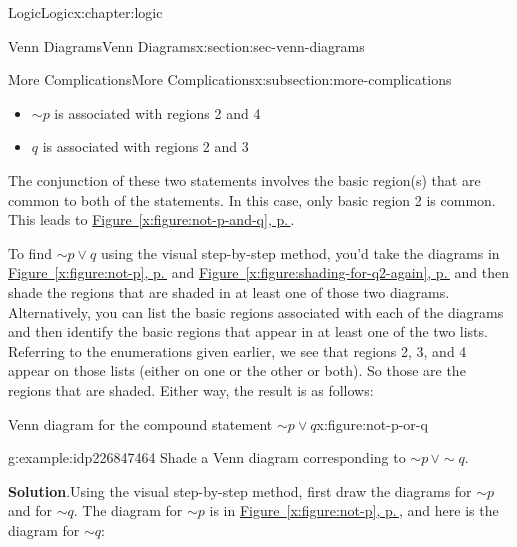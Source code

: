 \documentclass[twoside,10pt,]{book}
\newcommand{\blocktitlefont}{\relax}
\newcommand{\xreffont}{\relax}
\numberwithin{equation}{section}
\begin{document}
\begin{chapterptx}{Logic}{}{Logic}{}{}{x:chapter:logic}
\begin{sectionptx}{Venn Diagrams}{}{Venn Diagrams}{}{}{x:section:sec-venn-diagrams}
\begin{subsectionptx}{More Complications}{}{More Complications}{}{}{x:subsection:more-complications}
\begin{itemize}[label=\textbullet]
\item{}\(\sim\!{p}\) is associated with regions 2 and 4%
\item{}\(q\) is associated with regions 2 and 3%
\end{itemize}
The conjunction of these two statements involves the basic region(s) that are common to both of the statements.  In this case, only basic region 2 is common.  This leads to \hyperref[x:figure:not-p-and-q]{Figure~{\xreffont\ref{x:figure:not-p-and-q}}, p.\,\pageref{x:figure:not-p-and-q}}.%
\par
To find \(\sim\!{p}{\vee} q\) using the visual step-by-step method, you'd take the diagrams in \hyperref[x:figure:not-p]{Figure~{\xreffont\ref{x:figure:not-p}}, p.\,\pageref{x:figure:not-p}} and \hyperref[x:figure:shading-for-q2-again]{Figure~{\xreffont\ref{x:figure:shading-for-q2-again}}, p.\,\pageref{x:figure:shading-for-q2-again}} and then shade the regions that are shaded in at least one of those two diagrams.  Alternatively, you can list the basic regions associated with each of the diagrams and then identify the basic regions that appear in at least one of the two lists.  Referring to the enumerations given earlier, we see that regions 2, 3, and 4 appear on those lists (either on one or the other or both).  So those are the regions that are shaded.  Either way, the result is as follows:%
\par
\begin{figureptx}{Venn diagram for the compound statement \(\sim\!{p}{\vee} q\)}{x:figure:not-p-or-q}{}%
\begin{image}{0.3}{0.4}{0.3}%
\resizebox{\linewidth}{!}{%
\begin{venndiagram2sets}[labelA={$p$},labelB={$q$}]
  \fillNotA
  \fillB
\end{venndiagram2sets}
}%
\end{image}%
\tcblower
\end{figureptx}%
%
\begin{example}{}{g:example:idp226847464}%
Shade a Venn diagram corresponding to \(\sim\!{p}\,{\vee}\sim\!{q}\).\par\smallskip%
\noindent\textbf{\blocktitlefont Solution}.\label{g:solution:idp226843496}{}\hypertarget{g:solution:idp226843496}{}\quad{}Using the visual step-by-step method, first draw the diagrams for \(\sim\!{p}\) and for \(\sim\!{q}\).  The diagram for \(\sim\!{p}\) is in \hyperref[x:figure:not-p]{Figure~{\xreffont\ref{x:figure:not-p}}, p.\,\pageref{x:figure:not-p}}, and here is the diagram for \(\sim\!{q}\):%

\end{example}
\end{subsectionptx}
\end{sectionptx}
\end{chapterptx}
\end{document}
